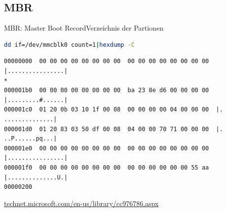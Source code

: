 \subsection{MBR}
\begin{frame}[fragile]{MBR: Master Boot Record}{Verzeichnis der Partionen}
\begin{lstlisting}[language=bash]
dd if=/dev/mmcblk0 count=1|hexdump -C
\end{lstlisting}
{\scriptsize
\begin{verbatim}
00000000  00 00 00 00 00 00 00 00  00 00 00 00 00 00 00 00  |................|
*
000001b0  00 00 00 00 00 00 00 00  ba 23 8e d6 00 00 00 00  |.........#......|
000001c0  01 20 0b 03 10 1f 00 08  00 00 00 00 04 00 00 00  |. ..............|
000001d0  01 20 83 03 50 df 00 08  04 00 00 70 71 00 00 00  |. ..P......pq...|
000001e0  00 00 00 00 00 00 00 00  00 00 00 00 00 00 00 00  |................|
000001f0  00 00 00 00 00 00 00 00  00 00 00 00 00 00 55 aa  |..............U.|
00000200
\end{verbatim}
}

{\scriptsize\url{technet.microsoft.com/en-us/library/cc976786.aspx}}

\end{frame}

